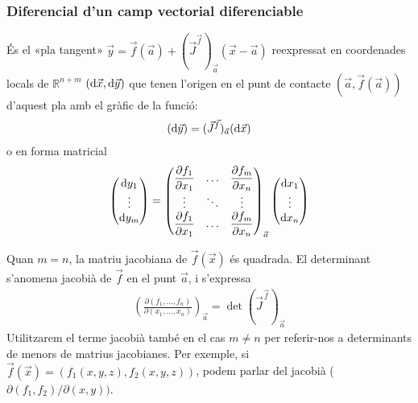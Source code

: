 \subsubsection*{Diferencial d'un camp vectorial diferenciable}
\begin{defi}[Diferencial]
    És el «pla tangent» $\vec{y} = \vec{f}(\vec{a}) + (\vec{J}^{\vec{f}})_{\vec{a}} (\vec{x} - \vec{a})$ reexpressat en coordenades locals de $\mathbb{R}^{n+m}$ $(\mathrm{d} \vec{x}, \mathrm{d} \vec{y})$ que tenen l'origen en el punt de contacte $(\vec{a}, \vec{f}(\vec{a}))$ d'aquest pla amb el gràfic de la funció:
    \begin{align}
        (\mathrm{d} \vec{y}) = (\vec{J}^{\vec{f}})_{\vec{a}} (\mathrm{d} \vec{x})
    \end{align}
    o en forma matricial
    \begin{align}
        \begin{pmatrix} \mathrm{d} y_{1} \\ \vdots \\ \mathrm{d} y_{m} \end{pmatrix} = \begin{pmatrix} \displaystyle \frac{\partial f_{1}}{\partial x_{1}} & \dots & \displaystyle \frac{\partial f_{m}}{\partial x_{n}} \\ \vdots & \ddots & \vdots \\ \displaystyle \frac{\partial f_{1}}{\partial x_{1}} & \dots & \displaystyle \frac{\partial f_{m}}{\partial x_{n}} \end{pmatrix}_{\vec{a}} \begin{pmatrix} \mathrm{d} x_{1} \\ \vdots \\ \mathrm{d} x_{n} \end{pmatrix}
    \end{align}
\end{defi}
\begin{defi}[Jacobià]
    Quan $m = n$, la matriu jacobiana de $\vec{f}(\vec{x})$ és quadrada. El determinant s'anomena jacobià de $\vec{f}$ en el punt $\vec{a}$, i s'expressa
    \begin{align}
        \left( \frac{\partial(f_{1}, \dots, f_{n})}{\partial (x_{1}, \dots, x_{n})} \right)_{\vec{a}} = \det (\vec{J}^{\vec{f}})_{\vec{a}}
    \end{align}
    Utilitzarem el terme jacobià també en el cas $m \neq n$ per referir-nos a determinants de menors de matrius jacobianes. Per exemple, si $\vec{f}(\vec{x}) = (f_{1}(x,y,z),f_{2}(x,y,z))$, podem parlar del jacobià ($\partial (f_{1}, f_{2}) / \partial (x,y))$.
\end{defi}

